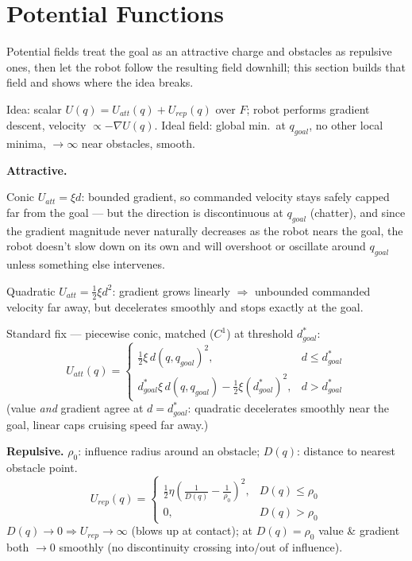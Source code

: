 \section{Potential Functions}

Potential fields treat the goal as an attractive charge and obstacles as repulsive ones, then let the robot follow the resulting field downhill; this section builds that field and shows where the idea breaks.

Idea: scalar $U(q)=U_{att}(q)+U_{rep}(q)$ over $F$; robot performs gradient descent, velocity $\propto-\nabla U(q)$. Ideal field: global min.\ at $q_{goal}$, no other local minima, $\to\infty$ near obstacles, smooth.


\textbf{Attractive.}

Conic $U_{att}=\xi d$: bounded gradient, so commanded velocity stays safely capped far from the goal --- but the direction is discontinuous at $q_{goal}$ (chatter), and since the gradient magnitude never naturally decreases as the robot nears the goal, the robot doesn't slow down on its own and will overshoot or oscillate around $q_{goal}$ unless something else intervenes.

Quadratic $U_{att}=\tfrac12\xi d^2$: gradient grows linearly $\Rightarrow$ unbounded commanded velocity far away, but decelerates smoothly and stops exactly at the goal.

Standard fix — piecewise conic, matched ($C^1$) at threshold $d_{goal}^*$:
\[
U_{att}(q)=\begin{cases}\tfrac12\xi\,d(q,q_{goal})^2, & d\le d_{goal}^*\\[3pt] d_{goal}^*\xi\,d(q,q_{goal})-\tfrac12\xi (d_{goal}^*)^2, & d> d_{goal}^*\end{cases}
\]
(value \emph{and} gradient agree at $d=d_{goal}^*$: quadratic decelerates smoothly near the goal, linear caps cruising speed far away.)

\textbf{Repulsive.} $\rho_0$: influence radius around an obstacle; $D(q)$: distance to nearest obstacle point.
\[
U_{rep}(q)=\begin{cases}\tfrac12\eta\left(\tfrac1{D(q)}-\tfrac1{\rho_0}\right)^2, & D(q)\le\rho_0\\[3pt] 0, & D(q)>\rho_0\end{cases}
\]
$D(q)\to0\Rightarrow U_{rep}\to\infty$ (blows up at contact); at $D(q)=\rho_0$ value \& gradient both $\to0$ smoothly (no discontinuity crossing into/out of influence).

